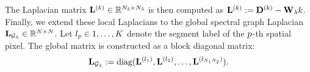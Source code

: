 The Laplacian matrix $\mathbf{L}^{(k)} \in \mathbb{R}^{N_{3} \times N_{3}}$ is then computed as $\mathbf{L}^{(k)} := \mathbf{D}^{(k)} - \mathbf{W}_{\lambda}{k}$. Finally, we extend these local Laplacians to the global spectral graph Laplacian $\mathbf{L}_{\mathcal{G}_{\lambda}} \in \mathbb{R}^{N \times N}$. Let $l_{p} \in {1, \ldots, K}$ denote the segment label of the $p$-th spatial pixel. The global matrix is constructed as a block diagonal matrix:
\begin{equation}
    \label{eq:SpecGraphLaplacian}
    \mathbf{L}_{\mathcal{G}_{\lambda}} := \text{diag}(\mathbf{L}^{(l_{1})}, \mathbf{L}^{(l_{2})}, \dots, \mathbf{L}^{(l_{N_{1} N_{2}})}).
\end{equation}



